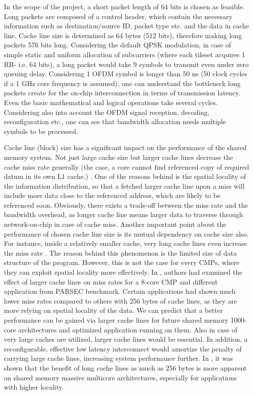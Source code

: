 In the scope of the project, a short packet length of 64 bits is chosen as feasible. Long packets are composed of a control header, which contain the necessary information such as destination/source ID, packet type etc. and the data in cache line. Cache line size is determined as 64 bytes (512 bits), therefore making long packets 576 bits long. Considering the default QPSK modulation, in case of simple static and uniform allocation of subcarriers (where each tileset acquires 1 RB- i.e. 64 bits), a long packet would take 9 symbols to transmit even under zero queuing delay. Considering 1 OFDM symbol is longer than 50 ns (50 clock cycles if a 1 GHz core frequency is assumed), one can understand the bottleneck long packets create for the on-chip interconnection in terms of transmission latency. Even the basic mathematical and logical operations take several cycles. Considering also into account the OFDM signal reception, decoding, reconfiguration etc., one can see that bandwidth allocation needs multiple symbols to be processed. 

Cache line (block) size has a significant impact on the performance of the shared memory system. Not just large cache size but larger cache lines decrease the cache miss rate generally (the case, a core cannot find referenced copy of required datum in its own L1 cache.) \cite{carter2001schaum}. One of the reasons behind is the spatial locality of the information distribution, so that a fetched larger cache line upon a miss will include more data close to the referenced address, which are likely to be referenced soon. Obviously, there exists a trade-off between the miss rate and the bandwidth overhead, as longer cache line means larger data to traverse through network-on-chip in case of cache miss. Another important point about the performance of chosen cache line size is its mutual dependency on cache size also. For instance, inside a relatively smaller cache, very long cache lines even increase the miss rate \cite{carter2001schaum}. The reason behind this phenomenon is the limited size of data structure of the program. However, this is not the case for every CMPs, where they can exploit spatial locality more effectively. In \cite{bienia2008parsec}, authors had examined the effect of larger cache lines on miss rates for a 8-core CMP and different application from PARSEC benchmark. Certain applications had shown much lower miss rates compared to others with 256 bytes of cache lines, as they are more relying on spatial locality of the data. We can predict that a better performance can be gained via larger cache lines for future shared memory 1000-core architectures and optimized application running on them. Also in case of very large caches are utilized, larger cache lines would be essential. In addition, a reconfigurable, effective low latency interconnect would amortize the penalty of carrying large cache lines, increasing system performance further. In \cite{ono2009adaptive}, it was shown that the benefit of long cache lines as much as 256 bytes is more apparent on shared memory massive multicore architectures, especially for applications with higher locality. 

